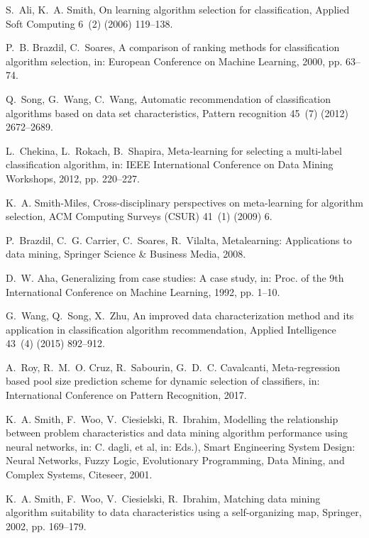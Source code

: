 \documentclass[review,3p,twocolumn,times]{elsarticle}
\begin{document}
\begin{thebibliography}{10}
	S.~Ali, K.~A. Smith, On learning algorithm selection for classification,
	Applied Soft Computing 6~(2) (2006) 119--138.
	
	P.~B. Brazdil, C.~Soares, A comparison of ranking methods for classification
	algorithm selection, in: European Conference on Machine Learning, 2000, pp.
	63--74.
	
	Q.~Song, G.~Wang, C.~Wang, Automatic recommendation of classification
	algorithms based on data set characteristics, Pattern recognition 45~(7)
	(2012) 2672--2689.
	
	L.~Chekina, L.~Rokach, B.~Shapira, Meta-learning for selecting a multi-label
	classification algorithm, in: IEEE International Conference on Data Mining
	Workshops, 2012, pp. 220--227.
	
	K.~A. Smith-Miles, Cross-disciplinary perspectives on meta-learning for
	algorithm selection, ACM Computing Surveys (CSUR) 41~(1) (2009) 6.
	
	P.~Brazdil, C.~G. Carrier, C.~Soares, R.~Vilalta, Metalearning: Applications to
	data mining, Springer Science \& Business Media, 2008.
	
	D.~W. Aha, Generalizing from case studies: A case study, in: Proc. of the 9th
	International Conference on Machine Learning, 1992, pp. 1--10.
	
	G.~Wang, Q.~Song, X.~Zhu, An improved data characterization method and its
	application in classification algorithm recommendation, Applied Intelligence
	43~(4) (2015) 892--912.
	
	A.~Roy, R.~M.~O. Cruz, R.~Sabourin, G.~D.~C. Cavalcanti, Meta-regression based
	pool size prediction scheme for dynamic selection of classifiers, in:
	International Conference on Pattern Recognition, 2017.
	
	K.~A. Smith, F.~Woo, V.~Ciesielski, R.~Ibrahim, Modelling the relationship
	between problem characteristics and data mining algorithm performance using
	neural networks, in: C. dagli, et al, in: Eds.), Smart Engineering System
	Design: Neural Networks, Fuzzy Logic, Evolutionary Programming, Data Mining,
	and Complex Systems, Citeseer, 2001.
	
	K.~A. Smith, F.~Woo, V.~Ciesielski, R.~Ibrahim, Matching data mining algorithm
	suitability to data characteristics using a self-organizing map, Springer,
	2002, pp. 169--179.
	

\end{thebibliography}
\end{document}
